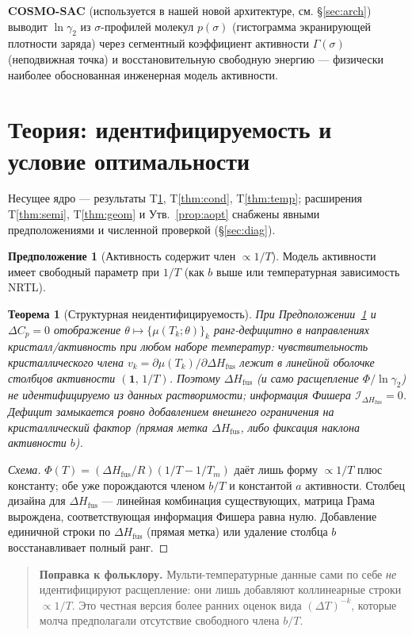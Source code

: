 \documentclass[11pt]{article}
\theoremstyle{plain}
\newtheorem{theorem}{Теорема}
\theoremstyle{definition}
\newtheorem{assumption}{Предположение}
\newcommand{\dHfus}{\Delta H_{\mathrm{fus}}}
\newcommand{\Tm}{T_m}
\newcommand{\lng}{\ln\gamma_2}
\begin{document}
\textbf{COSMO-SAC} (используется в нашей новой архитектуре, см.
\S\ref{sec:arch}) выводит $\lng$ из $\sigma$-профилей молекул $p(\sigma)$
(гистограмма экранирующей плотности заряда) через сегментный коэффициент
активности $\Gamma(\sigma)$ (неподвижная точка) и восстановительную свободную
энергию --- физически наиболее обоснованная инженерная модель активности.

\section{Теория: идентифицируемость и условие оптимальности}
\label{sec:theory}
Несущее ядро --- результаты T\ref{thm:ident}, T\ref{thm:cond}, T\ref{thm:temp};
расширения T\ref{thm:semi}, T\ref{thm:geom} и Утв.~\ref{prop:aopt} снабжены явными
предположениями и численной проверкой (\S\ref{sec:diag}).

\begin{assumption}[Активность содержит член $\propto 1/T$]\label{asm:b}
Модель активности имеет свободный параметр при $1/T$ (как $b$ выше или
температурная зависимость NRTL).
\end{assumption}

\begin{theorem}[Структурная неидентифицируемость]\label{thm:ident}
При Предположении~\ref{asm:b} и $\Delta C_p=0$ отображение
$\theta\mapsto\{\mu(T_k;\theta)\}_k$ ранг-дефицитно в направлениях
кристалл/активность при любом наборе температур: чувствительность
кристаллического члена $v_k=\partial\mu(T_k)/\partial\dHfus$ лежит в линейной
оболочке столбцов активности $(\mathbf 1,\,1/T)$. Поэтому $\dHfus$ (и само
расщепление $\Phi/\lng$) \emph{не} идентифицируемо из данных растворимости;
информация Фишера $\mathcal I_{\dHfus}=0$. Дефицит замыкается ровно добавлением
внешнего ограничения на кристаллический фактор (прямая метка $\dHfus$, либо
фиксация наклона активности $b$).
\end{theorem}
\begin{proof}[Схема]
$\Phi(T)=(\dHfus/R)(1/T-1/\Tm)$ даёт лишь форму $\propto 1/T$ плюс константу; обе
уже порождаются членом $b/T$ и константой $a$ активности. Столбец дизайна для
$\dHfus$ --- линейная комбинация существующих, матрица Грама вырождена,
соответствующая информация Фишера равна нулю. Добавление единичной строки по
$\dHfus$ (прямая метка) или удаление столбца $b$ восстанавливает полный ранг.
\end{proof}

\begin{quote}\textbf{Поправка к фольклору.} Мульти-температурные данные сами по
себе \emph{не} идентифицируют расщепление: они лишь добавляют коллинеарные строки
$\propto 1/T$. Это честная версия более ранних оценок вида $(\Delta T)^{-k}$,
которые молча предполагали отсутствие свободного члена $b/T$.\end{quote}
\end{document}
